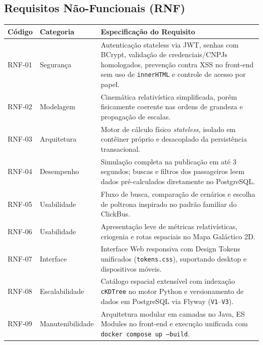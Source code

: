 \documentclass[12pt, a4paper]{article}
\begin{document}
\subsection{Requisitos Não-Funcionais (RNF)}
\begin{table}[H]
\centering
\renewcommand{\arraystretch}{1.25}
\begin{tabularx}{\textwidth}{l l X}
\toprule
\textbf{Código} & \textbf{Categoria} & \textbf{Especificação do Requisito} \\
\midrule
RNF-01 & Segurança & Autenticação stateless via JWT, senhas com BCrypt, validação de credenciais/CNPJs homologados, prevenção contra XSS no front-end sem uso de \texttt{innerHTML} e controle de acesso por papel. \\
RNF-02 & Modelagem & Cinemática relativística simplificada, porém fisicamente coerente nas ordens de grandeza e propagação de escalas. \\
RNF-03 & Arquitetura & Motor de cálculo físico \textit{stateless}, isolado em contêiner próprio e desacoplado da persistência transacional. \\
RNF-04 & Desempenho & Simulação completa na publicação em até 3 segundos; buscas e filtros dos passageiros leem dados pré-calculados diretamente no PostgreSQL. \\
RNF-05 & Usabilidade & Fluxo de busca, comparação de cenários e escolha de poltrona inspirado no padrão familiar do ClickBus. \\
RNF-06 & Usabilidade & Apresentação leve de métricas relativísticas, criogenia e rotas espaciais no Mapa Galáctico 2D. \\
RNF-07 & Interface & Interface Web responsiva com Design Tokens unificados (\texttt{tokens.css}), suportando desktop e dispositivos móveis. \\
RNF-08 & Escalabilidade & Catálogo espacial extensível com indexação \texttt{cKDTree} no motor Python e versionamento de dados em PostgreSQL via Flyway (\texttt{V1}--\texttt{V3}). \\
RNF-09 & Manutenibilidade & Arquitetura modular em camadas no Java, ES Modules no front-end e execução unificada com \texttt{docker compose up --build}. \\
\bottomrule
\end{tabularx}
\end{table}

\clearpage
\end{document}
